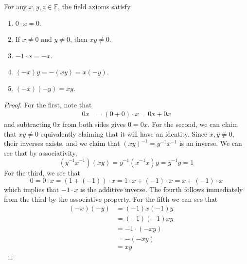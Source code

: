   \begin{lemma}
    \label{thm:properties-of-distribution}
    For any $x, y, z \in \mathbb{F}$, the field axioms satisfy 
    \begin{enumerate}
      \item $0 \cdot x = 0$.
      \item If $x \neq 0$ and $y \neq 0$, then $x y \neq 0$.
      \item $-1 \cdot x = -x$. 
      \item $(-x) y = - (xy) = x (-y)$. 
      \item $(-x) (-y) = xy$. 
    \end{enumerate}
  \end{lemma} 
  \begin{proof}
    For the first, note that 
    \begin{align}
      0 x & = (0 + 0) \cdot x = 0 x + 0x 
    \end{align}
    and subtracting $0x$ from both sides gives $0 = 0x$. For the second, we can claim that $xy \neq 0$ equivalently claiming that it will have an identity. Since $x, y \neq 0$, their inverses exists, and we claim that $(xy)^{-1} = y^{-1} x^{-1}$ is an inverse. We can see that by associativity, 
    \begin{equation}
      (y^{-1} x^{-1}) (xy) = y^{-1} (x^{-1} x) y = y^{-1} y = 1
    \end{equation} 
    For the third, we see that 
    \begin{equation}
      0 = 0 \cdot x = (1 + (-1)) \cdot x = 1 \cdot x + (-1) \cdot x = x + (-1) \cdot x 
    \end{equation}
    which implies that $-1 \cdot x$ is the additive inverse. The fourth follows immediately from the third by the associative property. For the fifth we can see that 
    \begin{align}
      (-x) (-y) & = (-1) x (-1) y && \tag{property 3} \\
                & = (-1) (-1) x y && \tag{$\times$ is commutative} \\
                & = -1 \cdot (-xy) && \tag{property 3} \\
                & = -(-xy) && \tag{property 3} \\
                & = xy && \tag{addition property 4}
    \end{align}
  \end{proof}

